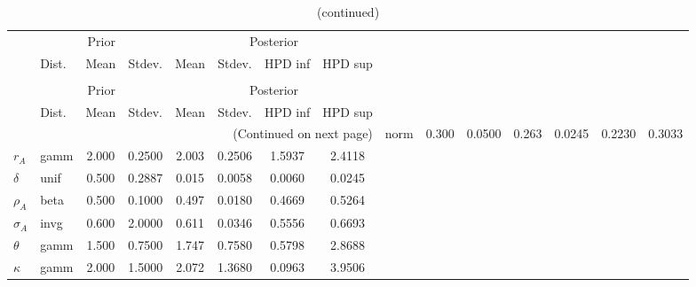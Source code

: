  
\begin{center}
\begin{longtable}{llcccccc} 
\caption{Results from Metropolis-Hastings (parameters)}
 \label{Table:MHPosterior:1}\\
\toprule 
  & \multicolumn{3}{c}{Prior}  &  \multicolumn{4}{c}{Posterior} \\
  \cmidrule(r{.75em}){2-4} \cmidrule(r{.75em}){5-8}
  & Dist. & Mean  & Stdev. & Mean & Stdev. & HPD inf & HPD sup\\
\midrule \endfirsthead 
\caption{(continued)}\\\toprule 
  & \multicolumn{3}{c}{Prior}  &  \multicolumn{4}{c}{Posterior} \\
  \cmidrule(r{.75em}){2-4} \cmidrule(r{.75em}){5-8}
  & Dist. & Mean  & Stdev. & Mean & Stdev. & HPD inf & HPD sup\\
\midrule \endhead 
\bottomrule \multicolumn{8}{r}{(Continued on next page)} \endfoot 
\bottomrule \endlastfoot 
${\alpha}$ & norm &   0.300 & 0.0500 &   0.263& 0.0245 &  0.2230 &  0.3033 \\ 
${r_{A}}$ & gamm &   2.000 & 0.2500 &   2.003& 0.2506 &  1.5937 &  2.4118 \\ 
${\delta}$ & unif &   0.500 & 0.2887 &   0.015& 0.0058 &  0.0060 &  0.0245 \\ 
${\rho_A}$ & beta &   0.500 & 0.1000 &   0.497& 0.0180 &  0.4669 &  0.5264 \\ 
${\sigma_A}$ & invg &   0.600 & 2.0000 &   0.611& 0.0346 &  0.5556 &  0.6693 \\ 
${\theta}$ & gamm &   1.500 & 0.7500 &   1.747& 0.7580 &  0.5798 &  2.8688 \\ 
${\kappa}$ & gamm &   2.000 & 1.5000 &   2.072& 1.3680 &  0.0963 &  3.9506 \\ 
\end{longtable}
 \end{center}
